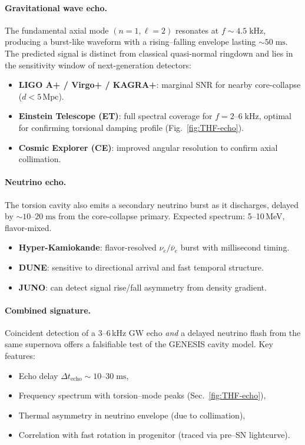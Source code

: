 \documentclass{article}
\begin{document}
\paragraph{Gravitational wave echo.}
The fundamental axial mode \((n=1,\ell=2)\) resonates at \(f \sim 4.5\;\mathrm{kHz}\),
producing a burst-like waveform with a rising--falling envelope
lasting \(\sim50\;\mathrm{ms}\).
The predicted signal is distinct from classical quasi-normal ringdown
and lies in the sensitivity window of next-generation detectors:

\begin{itemize}
\item \textbf{LIGO A+ / Virgo+ / KAGRA+}: marginal SNR for nearby core-collapse (\(d<5\,\mathrm{Mpc}\)).
\item \textbf{Einstein Telescope (ET)}: full spectral coverage for \(f = 2\text{--}6\;\mathrm{kHz}\),
       optimal for confirming torsional damping profile (Fig.~\ref{fig:THF-echo}).
\item \textbf{Cosmic Explorer (CE)}: improved angular resolution to confirm axial collimation.
\end{itemize}

\paragraph{Neutrino echo.}
The torsion cavity also emits a secondary neutrino burst as it discharges,
delayed by \(\sim10\text{--}20\;\mathrm{ms}\) from the core-collapse primary.
Expected spectrum: 5--10\,MeV, flavor-mixed.

\begin{itemize}
\item \textbf{Hyper-Kamiokande}: flavor-resolved \(\nu_e/\bar\nu_e\) burst with millisecond timing.
\item \textbf{DUNE}: sensitive to directional arrival and fast temporal structure.
\item \textbf{JUNO}: can detect signal rise/fall asymmetry from density gradient.
\end{itemize}

\paragraph{Combined signature.}
Coincident detection of a 3--6\,kHz GW echo \emph{and} a delayed neutrino flash
from the same supernova offers a falsifiable test of the GENESIS cavity model.
Key features:

\begin{itemize}
\item Echo delay \(\Delta t_{\text{echo}} \sim 10\text{--}30\;\mathrm{ms}\),
\item Frequency spectrum with torsion--mode peaks (Sec.~\ref{fig:THF-echo}),
\item Thermal asymmetry in neutrino envelope (due to collimation),
\item Correlation with fast rotation in progenitor (traced via pre--SN lightcurve).
\end{itemize}
\end{document}
